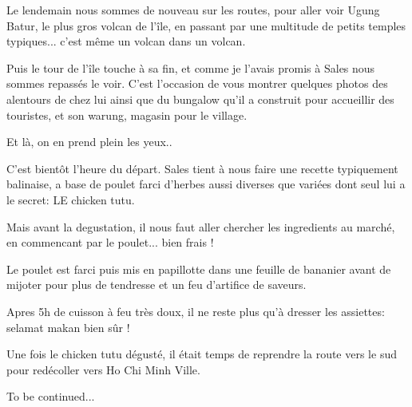 \begin{multicols}{2}

Le lendemain nous sommes de nouveau sur les routes, pour aller voir Ugung Batur, le plus gros volcan de l'île, en passant par une multitude de petits temples typiques... c'est même un volcan dans un volcan.


Puis le tour de l'île touche à sa fin, et comme je l'avais promis à Sales nous sommes repassés le voir. C'est l'occasion de vous montrer quelques photos des alentours de chez lui ainsi que du bungalow qu'il a construit pour accueillir des touristes, et son warung, magasin pour le village.


Et là, on en prend plein les yeux..


C'est bientôt l'heure du départ. Sales tient à nous faire une recette typiquement balinaise, a base de poulet farci d'herbes aussi diverses que variées dont seul lui a le secret: LE chicken tutu.

Mais avant la degustation, il nous faut aller chercher les ingredients au marché, en commencant par le poulet... bien frais !


Le poulet est farci puis mis en papillotte dans une feuille de bananier avant de mijoter pour plus de tendresse et un feu d'artifice de saveurs.


Apres 5h de cuisson à feu très doux, il ne reste plus qu'à dresser les assiettes: selamat makan bien sûr !


Une fois le chicken tutu dégusté, il était temps de reprendre la route vers le sud pour redécoller vers Ho Chi Minh Ville.

To be continued...

\end{multicols}


